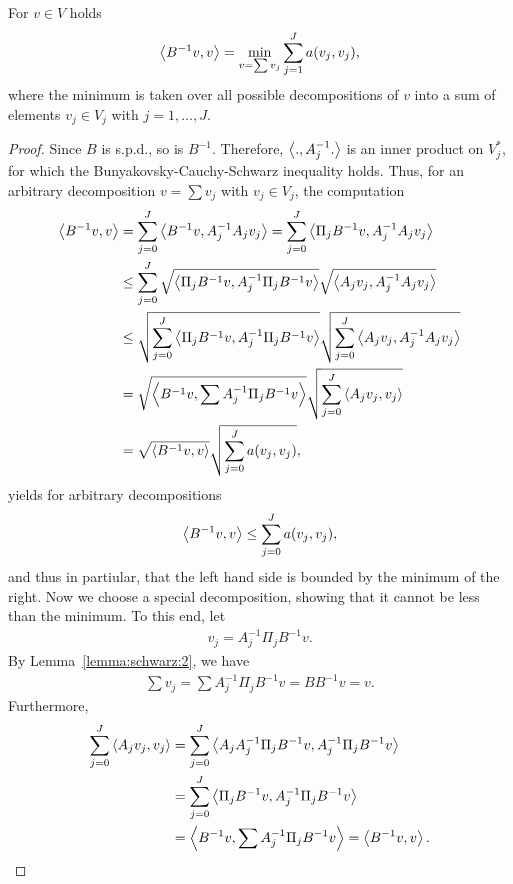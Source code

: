 \begin{lemma}
  For $v\in V$ holds
  \begin{gather}
    \label{eq:schwarz:5}
    \scal(B^{-1}v,v) = \min_{v=\sum v_j} \sum_{j=1}^J a(v_j,v_j),
  \end{gather}
  where the minimum is taken over all possible decompositions of $v$
  into a sum of elements $v_j\in V_j$ with $j=1,\dots,J$.
\end{lemma}

\begin{proof}
  Since $B$ is s.p.d., so is $B^{-1}$. Therefore, $\scal(.,A_j^{-1}.)$
  is an inner product on $V_j^*$, for which the Bunyakovsky-Cauchy-Schwarz
  inequality holds. Thus, for an arbitrary decomposition $v=\sum v_j$
  with $v_j\in V_j$, the computation
  \begin{align*}
    \scal(B^{-1}v,v)
    &= \sum_{j=0}^J \scal(B^{-1} v, A_j^{-1} A_j v_j)
    = \sum_{j=0}^J \scal(\Pi_j B^{-1} v, A_j^{-1} A_j v_j) \\
    &\le \sum_{j=0}^J \sqrt{\scal(\Pi_j B^{-1} v, A_j^{-1}\Pi_j B^{-1} v)}
    \sqrt{\scal(A_j v_j, A_j^{-1}A_j v_j)} \\
    & \le \sqrt{\sum_{j=0}^J \scal(\Pi_j B^{-1} v, A_j^{-1}\Pi_j
      B^{-1} v) }
    \sqrt{\sum_{j=0}^J \scal(A_j v_j,A_j^{-1}A_j v_j)} \\
    &= \sqrt{\scal(B^{-1} v, {\sum A_j^{-1}\Pi_j} B^{-1}v)}
    \sqrt{\sum_{j=0}^J \scal(A_j v_j, v_j)} \\
    &= \sqrt{\scal(B^{-1}v,v)} \sqrt{\sum_{j=0}^J a(v_j, v_j)},
  \end{align*}
  yields for arbitrary decompositions
  \begin{gather}
    \label{eq:schwarz:17}
    \scal(B^{-1}v,v) \le \sum_{j=0}^J a(v_j, v_j),
  \end{gather}
  and thus in partiular, that the left hand side is bounded by the
  minimum of the right. Now we choose a special decomposition, showing
  that it cannot be less than the minimum. To this end, let
  \begin{gather}
    \label{eq:schwarz:18}
    v_j = A_j^{-1} \Pi_j B^{-1} v.
  \end{gather}
  By Lemma~\ref{lemma:schwarz:2}, we have
  \begin{gather*}
    \sum v_j = \sum A_j^{-1} \Pi_j B^{-1} v = B B^{-1} v = v.
  \end{gather*}
  Furthermore,
  \begin{align*}
    \sum_{j=0}^J \scal(A_j v_j, v_j)
    &= \sum_{j=0}^J \scal(A_j A_j^{-1} \Pi_j B^{-1} v, A_j^{-1} \Pi_j
    B^{-1} v) \\
    &= \sum_{j=0}^J \scal(\Pi_j B^{-1} v, A_j^{-1} \Pi_j B^{-1} v) \\
    &= \scal(B^{-1} v, \sum A_j^{-1} \Pi_j B^{-1} v) = \scal(B^{-1} v, v).
  \end{align*}
\end{proof}

